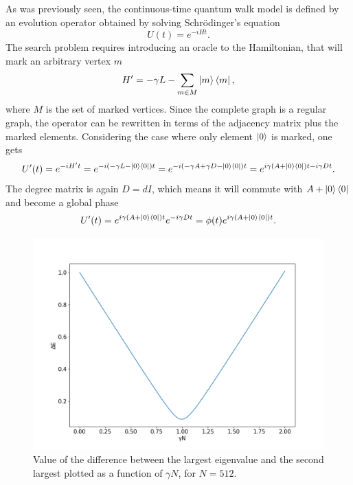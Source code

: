 \documentclass[../../dissertation.tex]{subfiles}
\begin{document}
As was previously seen, the continuous-time quantum walk model is defined by an
evolution operator obtained by solving Schrödinger's equation
\begin{equation}
	U(t) = e^{-iHt}.
\end{equation}
The search problem requires introducing an oracle to the Hamiltonian, that will
mark an arbitrary vertex $m$ 
\begin{equation}
	H' = -\gamma L - \sum_{m \in M}\ket{m}\bra{m},
\end{equation}
where $M$ is the set of marked vertices. Since the complete graph is a regular
graph, the operator can be rewritten in terms of the adjacency matrix plus the
marked elements. Considering the case where only element $\ket{0}$ is marked,
one gets
\begin{equation}
	U'(t) = e^{-iH't} = e^{-i(-\gamma L - \ket{0}\bra{0})t} = e^{-i(-\gamma A + \gamma D - \ket{0}\bra{0})t} = e^{i\gamma(A+\ket{0}\bra{0})t - i\gamma D t}.
\end{equation}
The degree matrix is again $D=dI$, which means it will commute with
$A+\ket{0}\bra{0}$ and become a global phase
\begin{equation}
	U'(t) = e^{i\gamma(A+\ket{0}\bra{0})t}e^{-i\gamma D t} = \phi(t)e^{i\gamma(A+\ket{0}\bra{0})t}.
\end{equation}
\begin{figure}[h]
	\centering \includegraphics[scale=0.40]{img/ContQuantumWalk/Search/gamma512.png}
	\caption{Value of the difference between the largest eigenvalue and the second largest plotted as a function of $\gamma N$, for $N=512$.}
	\label{fig:gamma512}
\end{figure}\par
\end{document}
